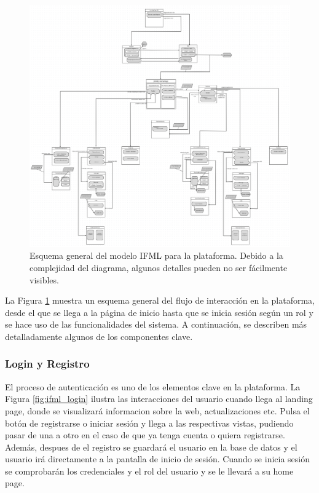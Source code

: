 \documentclass{article}
\begin{document}
\begin{figure}[H]
	\centering
	\includegraphics[width=\textwidth]{images/ifml_general.png}
	\caption{Esquema general del modelo IFML para la plataforma. Debido a la complejidad del diagrama, algunos detalles pueden no ser fácilmente visibles.}
	\label{fig:ifml_general}
\end{figure}

La Figura \ref{fig:ifml_general} muestra un esquema general del flujo de interacción en la plataforma, desde el que se llega a la página de inicio hasta que se inicia sesión según un rol y se hace uso de las funcionalidades del sistema. A continuación, se describen más detalladamente algunos de los componentes clave.
\newpage
\subsubsection{Login y Registro}

El proceso de autenticación es uno de los elementos clave en la plataforma. La Figura \ref{fig:ifml_login} ilustra las interacciones del usuario cuando llega al landing page, donde se visualizará informacion sobre la web, actualizaciones etc. Pulsa el botón de registrarse o iniciar sesión y llega a las respectivas vistas, pudiendo pasar de una a otro en el caso de que ya tenga cuenta o quiera registrarse. Además, despues de el registro se guardará el usuario en la base de datos y el usuario irá directamente a la pantalla de inicio de sesión. Cuando se inicia sesión se comprobarán los credenciales y el rol del usuario y se le llevará a su home page.
\end{document}
